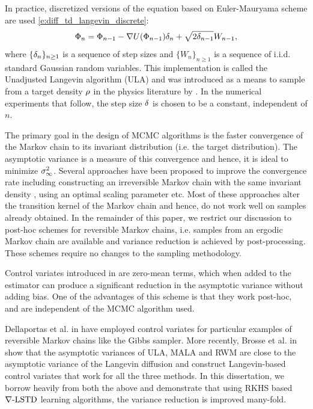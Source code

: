 In practice, discretized versions of the equation based on Euler-Mauryama scheme are used \eqref{e:diff_td_langevin_discrete}:
\begin{equation*}
\Phi_n = \Phi_{n-1} - \nabla U(\Phi_{n-1}) \delta_{n} + \sqrt{2  \delta_{n-1}} W_{n-1} ,
\end{equation*}
where $\{\delta_n\}_{n\geq 1}$ is a sequence of step sizes and $\{W_n\}_{n\geq 1}$ is a sequence of i.i.d. standard Gaussian random variables. This implementation is called the Unadjusted Langevin algorithm (ULA) and was introduced as a means to sample from a target density $\rho$ in the physics literature by \cite{par81}. In the numerical experiments that follow, the step size $\delta$ is chosen to be a constant, independent of $n$. 

The primary goal in the design of MCMC algorithms is the faster convergence of the Markov chain to its invariant distribution (i.e. the target distribution). The asymptotic variance is a measure of this convergence and hence, it is ideal to minimize $\sigma^2_\infty$. Several approaches have been proposed to improve the convergence rate including constructing an irreversible Markov chain with the same invariant density \cite{hwanorwu15, dunlelpav16}, using an optimal scaling parameter \cite{robros01} etc. Most of these approaches alter the transition kernel of the Markov chain and hence, do not work well on samples already obtained. In the remainder of this paper, we restrict our discussion to post-hoc schemes for reversible Markov chains, i.e. samples from an ergodic Markov chain are available and variance reduction is achieved by post-processing. These schemes require no changes to the sampling methodology. 

Control variates introduced in \cite{HenThesis,henmeytad03a,kimhen07,ctcn} are zero-mean terms, which when added to the estimator can produce a significant reduction in the asymptotic variance without adding bias. One of the advantages of this scheme is that they work post-hoc, and are independent of the MCMC algorithm used. %

Dellaportas et al. in \cite{delkon12} have employed control variates for particular examples of reversible Markov chains like the Gibbs sampler.
More recently, Brosse et al. in \cite{brodurmeymou18} show that the asymptotic variances of ULA, MALA and RWM are close to the asymptotic variance of the Langevin diffusion and construct Langevin-based control variates that work for all the three methods. In this dissertation, we borrow heavily from both the above and demonstrate that using RKHS based $\nabla\text{-LSTD}$ learning algorithms, the variance reduction is improved many-fold. 

